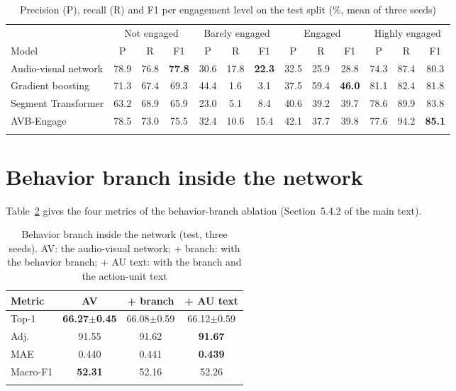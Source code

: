 \documentclass[pdflatex,sn-basic]{sn-jnl}
\newcommand{\ournet}{AVB-Engage}
\begin{document}
\begin{table}[t]
\caption{Precision (P), recall (R) and F1 per engagement level on the test split (\%, mean of three seeds)}\label{tab:levels}
\setlength{\tabcolsep}{3pt}
\begin{tabular*}{\textwidth}{@{\extracolsep\fill}lcccccccccccc}
\toprule
& \multicolumn{3}{c}{Not engaged} & \multicolumn{3}{c}{Barely engaged} & \multicolumn{3}{c}{Engaged} & \multicolumn{3}{c}{Highly engaged}\\
\cmidrule{2-4}\cmidrule{5-7}\cmidrule{8-10}\cmidrule{11-13}
Model & P & R & F1 & P & R & F1 & P & R & F1 & P & R & F1\\
\midrule
Audio-visual network & 78.9 & 76.8 & \textbf{77.8} & 30.6 & 17.8 & \textbf{22.3} & 32.5 & 25.9 & 28.8 & 74.3 & 87.4 & 80.3\\
Gradient boosting & 71.3 & 67.4 & 69.3 & 44.4 & 1.6 & 3.1 & 37.5 & 59.4 & \textbf{46.0} & 81.1 & 82.4 & 81.8\\
Segment Transformer & 63.2 & 68.9 & 65.9 & 23.0 & 5.1 & 8.4 & 40.6 & 39.2 & 39.7 & 78.6 & 89.9 & 83.8\\
\ournet & 78.5 & 73.0 & 75.5 & 32.4 & 10.6 & 15.4 & 42.1 & 37.7 & 39.8 & 77.6 & 94.2 & \textbf{85.1}\\
\botrule
\end{tabular*}
\end{table}

\section{Behavior branch inside the network}\label{sec:s_branch}

Table~\ref{tab:branch} gives the four metrics of the behavior-branch ablation (Section~5.4.2 of the main text).

\begin{table}[t]
\caption{Behavior branch inside the network (test, three seeds). AV: the audio-visual network; + branch: with the behavior branch; + AU text: with the branch and the action-unit text}\label{tab:branch}
\begin{tabular*}{0.6\textwidth}{@{\extracolsep\fill}lccc}
\toprule
Metric & AV & + branch & + AU text\\
\midrule
Top-1 & \textbf{66.27$\pm$0.45} & 66.08$\pm$0.59 & 66.12$\pm$0.59\\
Adj. & 91.55 & 91.62 & \textbf{91.67}\\
MAE & 0.440 & 0.441 & \textbf{0.439}\\
Macro-F1 & \textbf{52.31} & 52.16 & 52.26\\
\botrule
\end{tabular*}
\end{table}
\end{document}
